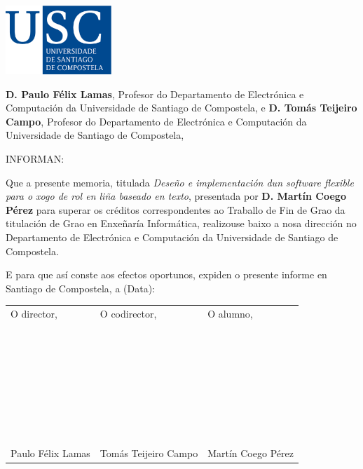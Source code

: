 \pagestyle{plain}
\includegraphics[width=4cm]{figuras/logo_usc.eps}

\vspace{1cm}
{\bf D. Paulo Félix Lamas}, Profesor do Departamento de Electrónica e
Computación da Universidade de Santiago de Compostela, e {\bf D. Tomás Teijeiro
Campo}, Profesor do Departamento de Electrónica e Computación da Universidade de
Santiago de Compostela,

\vspace{1cm}
INFORMAN:

\vspace{1cm}
Que a presente memoria, titulada {\it Deseño e implementación dun software
flexible para o xogo de rol en liña baseado en texto}, presentada por {\bf D.
Martín Coego Pérez} para superar os créditos correspondentes ao
Traballo de Fin de Grao da titulación de Grao en Enxeñaría Informática,
realizouse baixo a nosa dirección no Departamento de Electrónica e Computación
da Universidade de Santiago de Compostela.

\vspace{1cm}
E para que así conste aos efectos oportunos, expiden o presente informe en
Santiago de Compostela, a (Data):

\vspace{2cm}
\begin{tabular}{lll}
O director, & O codirector, & O alumno, \\
~ \\
~ \\
~ \\
~ \\
~ \\
~ \\
~ \\
Paulo Félix Lamas & Tomás Teijeiro Campo & Martín Coego Pérez
\end{tabular}

